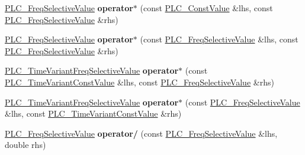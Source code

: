 \begin{DoxyCompactItemize}
\item 
\hypertarget{classns3_1_1PLC__FreqSelectiveValue_a5e9a217f12df86aabaa6f79ac85e2eeb}{\hyperlink{classns3_1_1PLC__FreqSelectiveValue}{\-P\-L\-C\-\_\-\-Freq\-Selective\-Value} {\bfseries operator$\ast$} (const \hyperlink{classns3_1_1PLC__ConstValue}{\-P\-L\-C\-\_\-\-Const\-Value} \&lhs, const \hyperlink{classns3_1_1PLC__FreqSelectiveValue}{\-P\-L\-C\-\_\-\-Freq\-Selective\-Value} \&rhs)}\label{classns3_1_1PLC__FreqSelectiveValue_a5e9a217f12df86aabaa6f79ac85e2eeb}

\item 
\hypertarget{classns3_1_1PLC__FreqSelectiveValue_acd68b73fd67314ed739aa1a8990a7c93}{\hyperlink{classns3_1_1PLC__FreqSelectiveValue}{\-P\-L\-C\-\_\-\-Freq\-Selective\-Value} {\bfseries operator$\ast$} (const \hyperlink{classns3_1_1PLC__FreqSelectiveValue}{\-P\-L\-C\-\_\-\-Freq\-Selective\-Value} \&lhs, const \hyperlink{classns3_1_1PLC__FreqSelectiveValue}{\-P\-L\-C\-\_\-\-Freq\-Selective\-Value} \&rhs)}\label{classns3_1_1PLC__FreqSelectiveValue_acd68b73fd67314ed739aa1a8990a7c93}

\item 
\hypertarget{classns3_1_1PLC__FreqSelectiveValue_a98a7967618d0d619603a8af279eb8919}{\hyperlink{classns3_1_1PLC__TimeVariantFreqSelectiveValue}{\-P\-L\-C\-\_\-\-Time\-Variant\-Freq\-Selective\-Value} {\bfseries operator$\ast$} (const \hyperlink{classns3_1_1PLC__TimeVariantConstValue}{\-P\-L\-C\-\_\-\-Time\-Variant\-Const\-Value} \&lhs, const \hyperlink{classns3_1_1PLC__FreqSelectiveValue}{\-P\-L\-C\-\_\-\-Freq\-Selective\-Value} \&rhs)}\label{classns3_1_1PLC__FreqSelectiveValue_a98a7967618d0d619603a8af279eb8919}

\item 
\hypertarget{classns3_1_1PLC__FreqSelectiveValue_a94310ec03556c2390343a5e2239ca9cf}{\hyperlink{classns3_1_1PLC__TimeVariantFreqSelectiveValue}{\-P\-L\-C\-\_\-\-Time\-Variant\-Freq\-Selective\-Value} {\bfseries operator$\ast$} (const \hyperlink{classns3_1_1PLC__FreqSelectiveValue}{\-P\-L\-C\-\_\-\-Freq\-Selective\-Value} \&lhs, const \hyperlink{classns3_1_1PLC__TimeVariantConstValue}{\-P\-L\-C\-\_\-\-Time\-Variant\-Const\-Value} \&rhs)}\label{classns3_1_1PLC__FreqSelectiveValue_a94310ec03556c2390343a5e2239ca9cf}

\item 
\hypertarget{classns3_1_1PLC__FreqSelectiveValue_a0152530fd94b46f4d1abce2ef005f41c}{\hyperlink{classns3_1_1PLC__FreqSelectiveValue}{\-P\-L\-C\-\_\-\-Freq\-Selective\-Value} {\bfseries operator/} (const \hyperlink{classns3_1_1PLC__FreqSelectiveValue}{\-P\-L\-C\-\_\-\-Freq\-Selective\-Value} \&lhs, double rhs)}\label{classns3_1_1PLC__FreqSelectiveValue_a0152530fd94b46f4d1abce2ef005f41c}


\end{DoxyCompactItemize}
